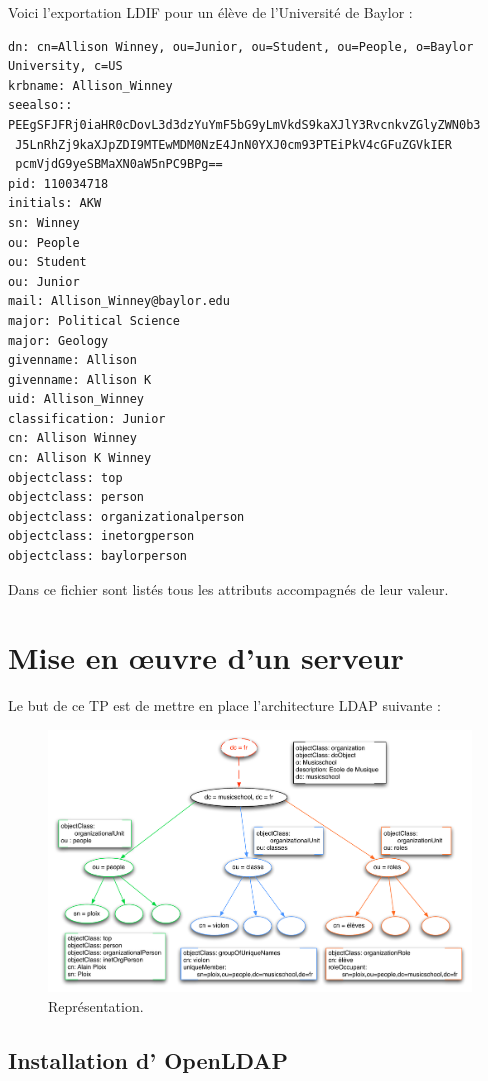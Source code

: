 \documentclass[12pt,a4paper,notitlepage]{article}
\begin{document}
Voici l'exportation LDIF pour un élève de l'Université de Baylor :\\
\begin{lstlisting}[title=Export LDIF d'une entrée élève]
dn: cn=Allison Winney, ou=Junior, ou=Student, ou=People, o=Baylor University, c=US
krbname: Allison_Winney
seealso:: PEEgSFJFRj0iaHR0cDovL3d3dzYuYmF5bG9yLmVkdS9kaXJlY3RvcnkvZGlyZWN0b3
 J5LnRhZj9kaXJpZDI9MTEwMDM0NzE4JnN0YXJ0cm93PTEiPkV4cGFuZGVkIER
 pcmVjdG9yeSBMaXN0aW5nPC9BPg==
pid: 110034718
initials: AKW
sn: Winney
ou: People
ou: Student
ou: Junior
mail: Allison_Winney@baylor.edu
major: Political Science
major: Geology
givenname: Allison
givenname: Allison K
uid: Allison_Winney
classification: Junior
cn: Allison Winney
cn: Allison K Winney
objectclass: top
objectclass: person
objectclass: organizationalperson
objectclass: inetorgperson
objectclass: baylorperson
\end{lstlisting}

Dans ce fichier sont listés tous les attributs accompagnés de leur valeur.

\clearpage
\section{Mise en \oe uvre d'un serveur}

Le but de ce TP est de mettre en place l'architecture LDAP suivante :
\begin{figure}[!h]
\begin{center}
\includegraphics[scale=0.64]{tpldap}
\caption{Représentation.}
\end{center}
\end{figure}


\subsection{Installation d' OpenLDAP}
\end{document}
